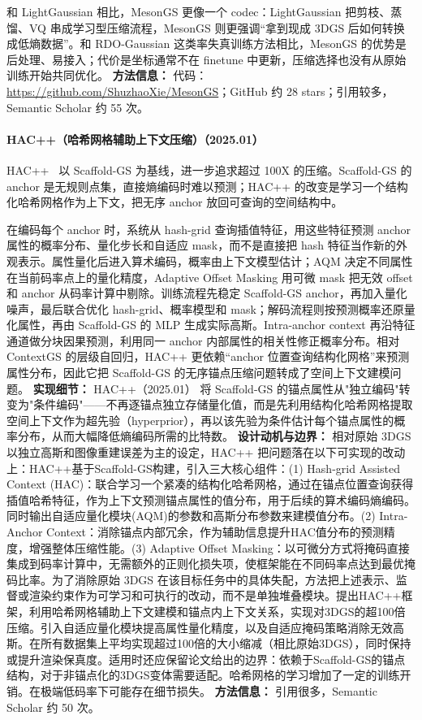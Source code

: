 和 LightGaussian 相比，MesonGS 更像一个 codec：LightGaussian 把剪枝、蒸馏、VQ 串成学习型压缩流程，MesonGS 则更强调“拿到现成 3DGS 后如何转换成低熵数据”。和 RDO-Gaussian 这类率失真训练方法相比，MesonGS 的优势是后处理、易接入；代价是坐标通常不在 finetune 中更新，压缩选择也没有从原始训练开始共同优化。
\textbf{方法信息：} 代码：\url{https://github.com/ShuzhaoXie/MesonGS}；GitHub 约 28 stars；引用较多，Semantic Scholar 约 55 次。



\paragraph{HAC++（哈希网格辅助上下文压缩）（2025.01）}
HAC++~\cite{2501_12255} 以 Scaffold-GS 为基线，进一步追求超过 100X 的压缩。Scaffold-GS 的 anchor 是无规则点集，直接熵编码时难以预测；HAC++ 的改变是学习一个结构化哈希网格作为上下文，把无序 anchor 放回可查询的空间结构中。

在编码每个 anchor 时，系统从 hash-grid 查询插值特征，用这些特征预测 anchor 属性的概率分布、量化步长和自适应 mask，而不是直接把 hash 特征当作新的外观表示。属性量化后进入算术编码，概率由上下文模型估计；AQM 决定不同属性在当前码率点上的量化精度，Adaptive Offset Masking 用可微 mask 把无效 offset 和 anchor 从码率计算中剔除。训练流程先稳定 Scaffold-GS anchor，再加入量化噪声，最后联合优化 hash-grid、概率模型和 mask；解码流程则按预测概率还原量化属性，再由 Scaffold-GS 的 MLP 生成实际高斯。Intra-anchor context 再沿特征通道做分块因果预测，利用同一 anchor 内部属性的相关性修正概率分布。相对 ContextGS 的层级自回归，HAC++ 更依赖“anchor 位置查询结构化网格”来预测属性分布，因此它把 Scaffold-GS 的无序锚点压缩问题转成了空间上下文建模问题。
\textbf{实现细节：} HAC++（2025.01） 将 Scaffold-GS 的锚点属性从"独立编码"转变为"条件编码"——不再逐锚点独立存储量化值，而是先利用结构化哈希网格提取空间上下文作为超先验（hyperprior），再以该先验为条件估计每个锚点属性的概率分布，从而大幅降低熵编码所需的比特数。
\textbf{设计动机与边界：} 相对原始 3DGS 以独立高斯和图像重建误差为主的设定，HAC++ 把问题落在以下可实现的改动上：HAC++基于Scaffold-GS构建，引入三大核心组件：(1) Hash-grid Assisted Context (HAC)：联合学习一个紧凑的结构化哈希网格，通过在锚点位置查询获得插值哈希特征，作为上下文预测锚点属性的值分布，用于后续的算术编码熵编码。同时输出自适应量化模块(AQM)的参数和高斯分布参数来建模值分布。(2) Intra-Anchor Context：消除锚点内部冗余，作为辅助信息提升HAC值分布的预测精度，增强整体压缩性能。(3) Adaptive Offset Masking：以可微分方式将掩码直接集成到码率计算中，无需额外的正则化损失项，使框架能在不同码率点达到最优掩码比率。为了消除原始 3DGS 在该目标任务中的具体失配，方法把上述表示、监督或渲染约束作为可学习和可执行的改动，而不是单独堆叠模块。提出HAC++框架，利用哈希网格辅助上下文建模和锚点内上下文关系，实现对3DGS的超100倍压缩。引入自适应量化模块提高属性量化精度，以及自适应掩码策略消除无效高斯。在所有数据集上平均实现超过100倍的大小缩减（相比原始3DGS），同时保持或提升渲染保真度。适用时还应保留论文给出的边界：依赖于Scaffold-GS的锚点结构，对于非锚点化的3DGS变体需要适配。哈希网格的学习增加了一定的训练开销。在极端低码率下可能存在细节损失。
\textbf{方法信息：} 引用很多，Semantic Scholar 约 50 次。



